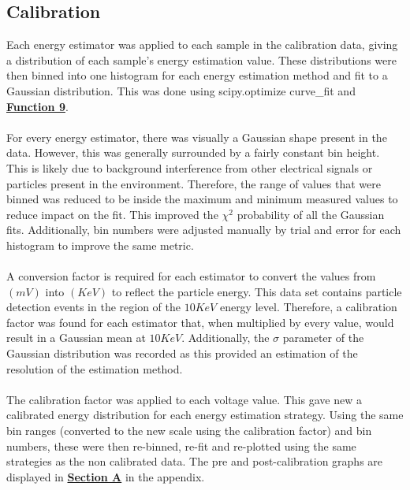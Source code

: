 \documentclass[
	letterpaper, %
	10pt, %
]{template}
\begin{document}
\subsection{Calibration}\label{sec::method-calibration}
Each energy estimator was applied to each sample in the calibration data, giving a distribution of each sample's energy estimation value. These distributions were then binned into one histogram for each energy estimation method and fit to a Gaussian distribution. This was done using scipy.optimize curve\_fit and \textbf{\hyperref[lst-9]{Function 9}}.\\\\
For every energy estimator, there was visually a Gaussian shape present in the data. However, this was generally surrounded by a fairly constant bin height. This is likely due to background interference from other electrical signals or particles present in the environment. Therefore, the range of values that were binned was reduced to be inside the maximum and minimum measured values to reduce impact on the fit. This improved the $\chi^2$ probability of all the Gaussian fits. Additionally, bin numbers were adjusted manually by trial and error for each histogram to improve the same metric. \\\\
A conversion factor is required for each estimator to convert the values from $(\unit{mV})$ into $(\unit{KeV})$ to reflect the particle energy. This data set contains particle detection events in the region of the $10\unit{KeV}$ energy level. Therefore, a calibration factor was found for each estimator that, when multiplied by every value, would result in a Gaussian mean at $10\unit{KeV}$. Additionally, the $\sigma$ parameter of the Gaussian distribution was recorded as this provided an estimation of the resolution of the estimation method.\\\\
The calibration factor was applied to each voltage value. This gave new a calibrated energy distribution for each energy estimation strategy. Using the same bin ranges (converted to the new scale using the calibration factor) and bin numbers, these were then re-binned, re-fit and re-plotted using the same strategies as the non calibrated data. The pre and post-calibration graphs are displayed in \textbf{\hyperref[sec::energyEst]{Section A}} in the appendix.
\end{document}
